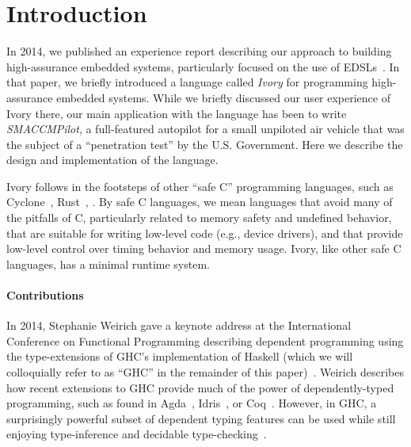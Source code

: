\section{Introduction}
\label{sec:introduction}


In 2014, we published an experience report describing our approach to building
high-assurance embedded systems, particularly focused on the use of
EDSLs~\cite{smaccm}. In that paper, we briefly introduced a language called
\emph{Ivory} for programming high-assurance embedded systems. While we briefly
discussed our user experience of Ivory there, our main application with the
language has been to write \emph{SMACCMPilot}, a full-featured autopilot for a
small unpiloted air vehicle that was the subject of a ``penetration test'' by
the U.S. Government. Here we describe the design and implementation of the
language.

Ivory follows in the footsteps of other ``safe C'' programming languages, such
as Cyclone~\cite{}, Rust~\cite{}, . By safe C languages, we mean
languages that avoid many of the pitfalls of C, particularly related to memory
safety and undefined behavior, that are suitable for writing low-level code
(e.g., device drivers), and that provide low-level control over timing behavior
and memory usage. Ivory, like other safe C languages, has a minimal runtime
system.

\paragraph{Contributions}
In 2014, Stephanie Weirich gave a keynote address at the International
Conference on Functional Programming describing dependent programming using the
type-extensions of GHC's implementation of Haskell (which we will colloquially
refer to as ``GHC'' in the remainder of this
paper)~\cite{weirich-keynote}. Weirich describes how recent extensions to GHC
provide much of the power of dependently-typed programming, such as found in
Agda~\cite{}, Idris~\cite{}, or Coq~\cite{}. However, in GHC, a surprisingly
powerful subset of dependent typing features can be used while still enjoying
type-inference and decidable type-checking~\cite{dephaskell}.

